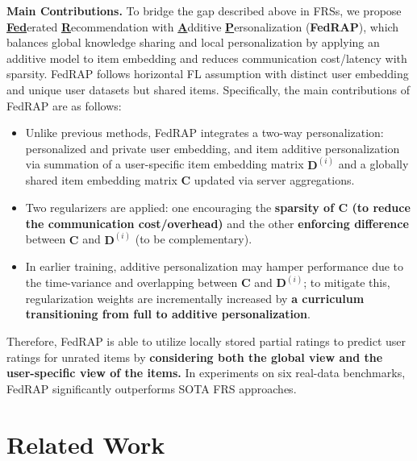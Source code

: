 \documentclass{article} %
\begin{document}
\textbf{Main Contributions.} To bridge the gap described above in FRSs, we propose \underline{\textbf{Fed}}erated \underline{\textbf{R}}ecommendation with \underline{\textbf{A}}dditive \underline{\textbf{P}}ersonalization (\textbf{FedRAP}), which balances global knowledge sharing and local personalization by applying an additive model to item embedding and reduces communication cost/latency with sparsity.  
FedRAP follows horizontal FL assumption \citep{alamgir2022federated} with distinct user embedding and unique user datasets but shared items. 
Specifically, the main contributions of FedRAP are as follows:
\begin{itemize}[leftmargin=*]
    \item Unlike previous methods, FedRAP integrates a two-way personalization: personalized and private user embedding, and item additive personalization via summation of a user-specific item embedding matrix $\mathbf{D}^{(i)}$ and a globally shared item embedding matrix $\mathbf{C}$ updated via server aggregations. 
    \item Two regularizers are applied: one encouraging the \textbf{sparsity of $\mathbf{C}$ (to reduce the communication cost/overhead)} and the other \textbf{enforcing difference} between $\mathbf{C}$ and $\mathbf{D}^{(i)}$ (to be complementary). 
    \item In earlier training, additive personalization may hamper performance due to the time-variance and overlapping between $\mathbf{C}$ and $\mathbf{D}^{(i)}$; to mitigate this, regularization weights are incrementally increased by \textbf{a curriculum transitioning from full to additive personalization}. 
\end{itemize}

Therefore, FedRAP is able to utilize locally stored partial ratings to predict user ratings for unrated items by \textbf{considering both the global view and the user-specific view of the items.} 
In experiments on six real-data benchmarks, FedRAP significantly outperforms SOTA FRS approaches. 

\section{Related Work}
\label{sec:related_work}
\end{document}
